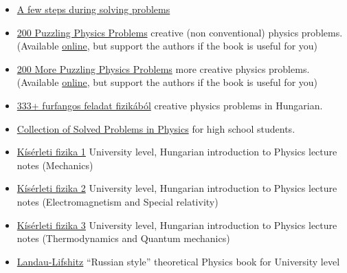 \documentclass{article}
\begin{document}
\begin{itemize}
\item \href{https://isaacphysics.org/solving_problems}{A few steps during solving problems}

\item \href{https://www.cambridge.org/core/books/200-puzzling-physics-problems/BBD12C169F5FAFDA285F155D62A04D12}{200 Puzzling Physics Problems} creative (non conventional) physics problems. (Available \href{https://dokumen.tips/documents/200-puzzling-physics-problemspdf.html}{online}, but support the authors if the book is useful for you)

\item \href{https://www.cambridge.org/hu/academic/subjects/physics/general-and-classical-physics/200-more-puzzling-physics-problems-hints-and-solutions?format=HB&isbn=9781107103856}{200 More Puzzling Physics Problems} more creative physics problems. (Available \href{https://ia801901.us.archive.org/13/items/200MorePuzzlingPhysicsProblems.pdf1/200\%20More\%20Puzzling\%20Physics\%20Problems.pdf-1.pdf}{online}, but support the authors if the book is useful for you)

\item \href{https://www.typotex.hu/book/8924/gnadig_honyek_vigh_333___furfangos_feladat_fizikabol}{333+ furfangos feladat fizikából} creative physics problems in Hungarian.

\item \href{http://physicstasks.eu/en}{Collection of Solved Problems in Physics} for high school students.

\item \href{https://mek.oszk.hu/14100/14198/14198.pdf}{Kísérleti fizika 1} University level, Hungarian introduction to Physics lecture notes (Mechanics)

\item \href{http://physics.bme.hu/sites/physics.bme.hu/files/users/BMETE12AF46_kov/kisfiz2_jav.pdf}{Kísérleti fizika 2} University level, Hungarian introduction to Physics lecture notes (Electromagnetism and Special relativity)

\item \href{http://physics.bme.hu/sites/physics.bme.hu/files/users/BMETE11AF46_kov/Jegyzet_UO.pdf}{Kísérleti fizika 3} University level, Hungarian  introduction to Physics lecture notes (Thermodynamics and Quantum mechanics)

\item \href{https://en.wikipedia.org/wiki/Course_of_Theoretical_Physics}{Landau-Lifshitz} ``Russian style'' theoretical Physics book for University level


\end{itemize}
\end{document}
